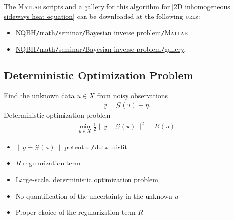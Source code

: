 \documentclass[oneside,11pt]{book}
\numberwithin{equation}{section}
\begin{document}
The \textsc{Matlab} scripts and a gallery for this algorithm for \eqref{2D inhomogeneous sideways heat equation} can be downloaded at the following \textsc{url}s:
\begin{itemize}
    \item \href{https://github.com/NQBH/miscellaneous/tree/master/math/seminar/Bayesian_inverse_problem/MATLAB}{NQBH\texttt{/}math\texttt{/}seminar\texttt{/}Bayesian inverse problem\texttt{/}\textsc{Matlab}}
    \item \href{https://github.com/NQBH/miscellaneous/tree/master/math/seminar/Bayesian_inverse_problem/gallery}{NQBH\texttt{/}math\texttt{/}seminar\texttt{/}Bayesian inverse problem\texttt{/}gallery}.
\end{itemize}

\subsection{Deterministic Optimization Problem}
Find the unknown data $u\in X$ from noisy observations
\begin{align*}
    y = \mathcal{G}(u) + \eta.
\end{align*}
Deterministic optimization problem
\begin{align*}
    \min_{u\in X} \frac{1}{2}\|y - \mathcal{G}(u)\|^2 + R(u).
\end{align*}
\begin{itemize}
    \item $\|y - \mathcal{G}(u)\|$ potential\texttt{/}data misfit
    \item $R$ regularization term
\end{itemize}
\begin{itemize}
    \item Large-scale, deterministic optimization problem
    \item No quantification of the uncertainty in the unknown $u$
    \item Proper choice of the regularization term $R$
\end{itemize}
\end{document}
